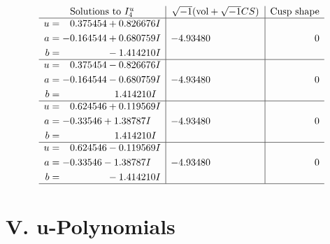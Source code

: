 \documentclass[1p]{elsarticle_modified}
\theoremstyle{definition}
\newcommand{\I}{\sqrt{-1}}
\begin{document}
$$\begin{array}{c|c|c}  
\text{Solutions to }I^u_{4}& \I (\text{vol} + \sqrt{-1}CS) & \text{Cusp shape}\\
 \hline 
\begin{aligned}
u &= \phantom{-}0.375454 + 0.826676 I \\
a &= -0.164544 + 0.680759 I \\
b &= \phantom{-0.000000 } -1.414210 I\end{aligned}
 & -4.93480\phantom{ +0.000000I} & \phantom{-0.000000 } 0 \\ \hline\begin{aligned}
u &= \phantom{-}0.375454 - 0.826676 I \\
a &= -0.164544 - 0.680759 I \\
b &= \phantom{-0.000000 -}1.414210 I\end{aligned}
 & -4.93480\phantom{ +0.000000I} & \phantom{-0.000000 } 0 \\ \hline\begin{aligned}
u &= \phantom{-}0.624546 + 0.119569 I \\
a &= -0.33546 + 1.38787 I \\
b &= \phantom{-0.000000 -}1.414210 I\end{aligned}
 & -4.93480\phantom{ +0.000000I} & \phantom{-0.000000 } 0 \\ \hline\begin{aligned}
u &= \phantom{-}0.624546 - 0.119569 I \\
a &= -0.33546 - 1.38787 I \\
b &= \phantom{-0.000000 } -1.414210 I\end{aligned}
 & -4.93480\phantom{ +0.000000I} & \phantom{-0.000000 } 0\\
 \hline 
 \end{array}$$\newpage
\newpage\renewcommand{\arraystretch}{1}
\centering \section*{ V. u-Polynomials}
\end{document}
